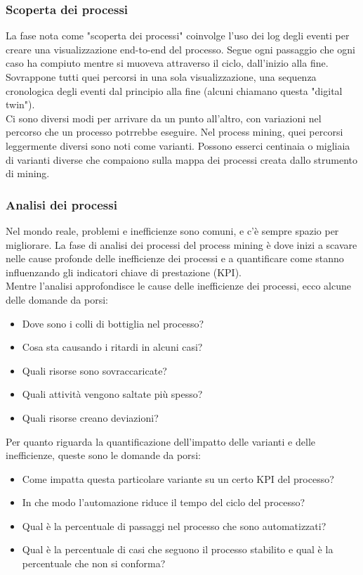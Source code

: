 \documentclass{article}
\begin{document}
\subsubsection{Scoperta dei processi}
La fase nota come "scoperta dei processi" coinvolge l'uso dei log degli eventi per creare una visualizzazione end-to-end del processo. Segue ogni passaggio che ogni caso ha compiuto mentre si muoveva attraverso il ciclo, dall'inizio alla fine. Sovrappone tutti quei percorsi in una sola visualizzazione, una sequenza cronologica degli eventi dal principio alla fine (alcuni chiamano questa "digital twin").\\
Ci sono diversi modi per arrivare da un punto all'altro, con variazioni nel percorso che un processo potrrebbe eseguire. Nel process mining, quei percorsi leggermente diversi sono noti come varianti. Possono esserci centinaia o migliaia di varianti diverse che compaiono sulla mappa dei processi creata dallo strumento di mining.
\subsubsection{Analisi dei processi}
Nel mondo reale, problemi e inefficienze sono comuni, e c'è sempre spazio per migliorare. La fase di analisi dei processi del process mining è dove inizi a scavare nelle cause profonde delle inefficienze dei processi e a quantificare come stanno influenzando gli indicatori chiave di prestazione (KPI).\\
Mentre l'analisi approfondisce le cause delle inefficienze dei processi, ecco alcune delle domande da porsi:
\begin{itemize}
    \item Dove sono i colli di bottiglia nel processo?
    \item Cosa sta causando i ritardi in alcuni casi?
    \item Quali risorse sono sovraccaricate?
    \item Quali attività vengono saltate più spesso?
    \item Quali risorse creano deviazioni?
\end{itemize}
Per quanto riguarda la quantificazione dell'impatto delle varianti e delle inefficienze, queste sono le domande da porsi:
\begin{itemize}
    \item Come impatta questa particolare variante su un certo KPI del processo?
    \item In che modo l'automazione riduce il tempo del ciclo del processo?
    \item Qual è la percentuale di passaggi nel processo che sono automatizzati?
    \item Qual è la percentuale di casi che seguono il processo stabilito e qual è la percentuale che non si conforma?
\end{itemize}
\end{document}
